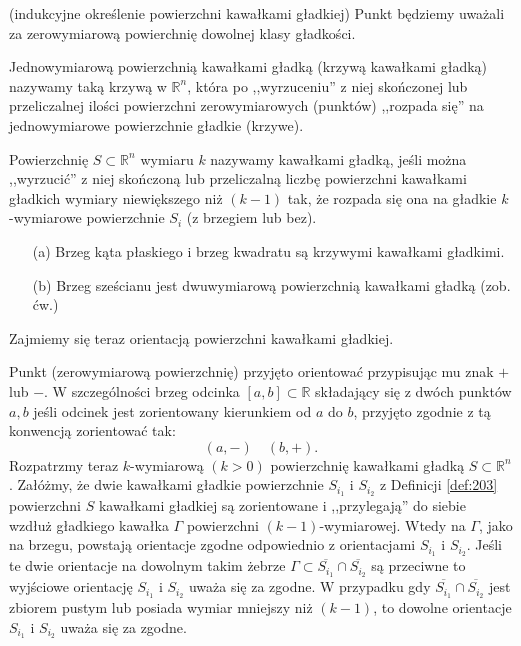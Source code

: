 \documentclass[leqno]{article}
\begin{document}
\begin{justify}
\begin{defn}
    (indukcyjne określenie powierzchni kawałkami gładkiej)
    Punkt będziemy uważali za zerowymiarową powierchnię dowolnej klasy gładkości.

    Jednowymiarową powierzchnią kawałkami gładką (krzywą kawałkami gładką) nazywamy taką krzywą w $\mathbb{R}^n$, która po ,,wyrzuceniu'' z niej 
    skończonej lub przeliczalnej ilości powierzchni zerowymiarowych (punktów) ,,rozpada się'' na jednowymiarowe powierzchnie gładkie (krzywe).

    Powierzchnię $S \subset \mathbb{R}^n$ wymiaru $k$ nazywamy kawałkami gładką, jeśli można ,,wyrzucić'' z niej skończoną lub 
    przeliczalną liczbę powierzchni kawałkami gładkich wymiary niewiększego niż $(k-1)$ tak, że rozpada się ona na gładkie $k$-wymiarowe powierzchnie $S_i$ (z brzegiem lub bez).
\end{defn}

\begin{ex}
    \begin{itemize}
        \item [(a)] Brzeg kąta płaskiego i brzeg kwadratu są krzywymi kawałkami gładkimi.
        \item [(b)] Brzeg sześcianu jest dwuwymiarową powierzchnią kawałkami gładką (zob. ćw.)
    \end{itemize}
\end{ex}

Zajmiemy się teraz orientacją powierzchni kawałkami gładkiej.

Punkt (zerowymiarową powierzchnię) przyjęto orientować przypisując mu znak $+$ lub $-$. 
W szczególności brzeg odcinka $[a,b] \subset \mathbb{R}$ składający się z dwóch punktów $a,b$ jeśli odcinek jest zorientowany kierunkiem od $a$ do $b$, przyjęto zgodnie 
z tą konwencją zorientować tak:
\[
    (a, -) \quad (b, +).
\]
Rozpatrzmy teraz $k$-wymiarową $(k > 0)$ powierzchnię kawałkami gładką $S \subset \mathbb{R}^n$.
Załóżmy, że dwie kawałkami gładkie powierzchnie $S_{i_1}$ i $S_{i_2}$ z Definicji \ref{def:203} powierzchni $S$ kawałkami 
gładkiej są zorientowane i ,,przylegają'' do siebie wzdłuż gładkiego kawałka $\Gamma$ powierzchni $(k-1)$-wymiarowej.
Wtedy na $\Gamma$, jako na brzegu, powstają orientacje zgodne odpowiednio z orientacjami $S_{i_1}$ i $S_{i_2}$.
Jeśli te dwie orientacje na dowolnym takim żebrze $\Gamma \subset \overline{S_{i_1}} \cap \overline{S_{i_2}}$ są przeciwne 
to wyjściowe orientację $S_{i_1}$ i $S_{i_2}$ uważa się za zgodne.
W przypadku gdy $\overline{S_{i_1}} \cap \overline{S_{i_2}}$ jest zbiorem pustym lub posiada wymiar mniejszy niż $(k-1)$, to dowolne orientacje
$S_{i_1}$ i $S_{i_2}$ uważa się za zgodne.


\end{justify}
\end{document}
